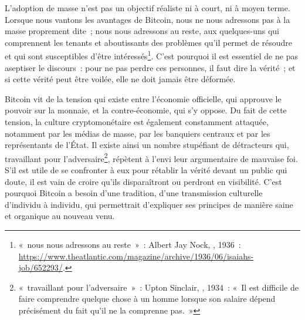 L'adoption de masse n'est pas un objectif réaliste ni à court, ni à moyen terme. Lorsque nous vantons les avantages de Bitcoin, nous ne nous adressons pas à la masse proprement dite~; nous nous adressons au reste, aux quelques-uns qui comprennent les tenants et aboutissants des problèmes qu'il permet de résoudre et qui sont susceptibles d'être intéressés\footnote{«~nous nous adressons au reste~»~: Albert Jay Nock, , 1936~: \url{https://www.theatlantic.com/magazine/archive/1936/06/isaiahs-job/652293/}.}. C'est pourquoi il est essentiel de ne pas aseptiser le discours~: pour ne pas perdre ces personnes, il faut dire la vérité~; et si cette vérité peut être voilée, elle ne doit jamais être déformée. %


Bitcoin vit de la tension qui existe entre l'économie officielle, qui approuve le pouvoir sur la monnaie, et la contre-économie, qui s'y oppose. Du fait de cette tension, la culture cryptomonétaire est également constamment attaquée, notamment par les médias de masse, par les banquiers centraux et par les représentants de l'État. Il existe ainsi un nombre stupéfiant de détracteurs qui, travaillant pour l'adversaire\footnote{«~travaillant pour l'adversaire~»~: Upton Sinclair, , 1934~: «~Il est difficile de faire comprendre quelque chose à un homme lorsque son salaire dépend précisément du fait qu'il ne la comprenne pas.~»}, répètent à l'envi leur argumentaire de mauvaise foi. S'il est utile de se confronter à eux pour rétablir la vérité devant un public qui doute, il est vain de croire qu'ils disparaîtront ou perdront en visibilité. C'est pourquoi Bitcoin a besoin d'une tradition, d'une transmission culturelle d'individu à individu, qui permettrait d'expliquer ses principes de manière saine et organique au nouveau venu. %

